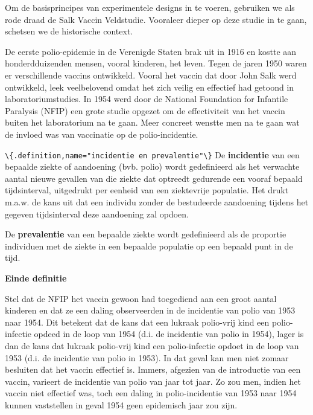 \documentclass[
  12pt,dutch,coursenotes]{book}
\newcommand{\passthrough}[1]{#1}
\begin{document}
Om de basisprincipes van experimentele designs in te voeren, gebruiken we als rode draad de Salk Vaccin Veldstudie. Vooraleer dieper op deze studie in te gaan, schetsen we de historische context.

De eerste polio-epidemie in de Verenigde Staten brak uit in 1916 en kostte
aan honderdduizenden mensen, vooral kinderen, het leven. Tegen de jaren 1950
waren er verschillende vaccins ontwikkeld. Vooral het vaccin dat door John
Salk werd ontwikkeld, leek veelbelovend omdat het zich veilig en effectief
had getoond in laboratoriumstudies. In 1954 werd door de National Foundation
for Infantile Paralysis (NFIP) een grote studie opgezet om de effectiviteit
van het vaccin buiten het laboratorium na te gaan. Meer concreet wenstte men
na te gaan wat de invloed was van vaccinatie op de polio-incidentie.

\passthrough{\lstinline!\{.definition,name="incidentie en prevalentie"\}!}
De \textbf{incidentie} van een bepaalde ziekte of aandoening (bvb. polio)
wordt gedefinieerd als het verwachte aantal nieuwe gevallen van die ziekte
dat optreedt gedurende een vooraf bepaald tijdsinterval, uitgedrukt per
eenheid van een ziektevrije populatie. Het drukt m.a.w. de kans uit dat een
individu zonder de bestudeerde aandoening tijdens het gegeven tijdsinterval
deze aandoening zal opdoen.

De \textbf{prevalentie} van een bepaalde ziekte wordt gedefinieerd als de
proportie individuen met de ziekte in een bepaalde populatie op een bepaald
punt in de tijd.

\textbf{Einde definitie}

Stel dat de NFIP het vaccin gewoon had toegediend aan een groot aantal
kinderen en dat ze een daling observeerden in de incidentie van polio van
1953 naar 1954. Dit betekent dat de kans dat een lukraak polio-vrij kind een
polio-infectie opdeed in de loop van 1954 (d.i. de incidentie van polio in
1954), lager is dan de kans dat lukraak polio-vrij kind een polio-infectie
opdoet in de loop van 1953 (d.i. de incidentie van polio in 1953). In dat
geval kan men niet zomaar besluiten dat het vaccin effectief is. Immers,
afgezien van de introductie van een vaccin, varieert de incidentie van polio
van jaar tot jaar. Zo zou men, indien het vaccin niet effectief was, toch
een daling in polio-incidentie van 1953 naar 1954 kunnen vaststellen in
geval 1954 geen epidemisch jaar zou zijn.
\end{document}
